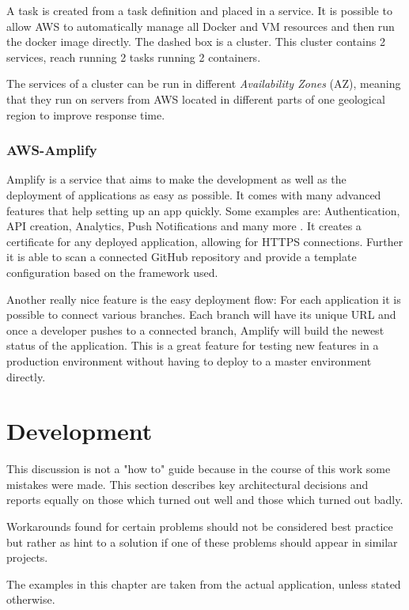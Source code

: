 A task is created from a task definition and placed in a service. It is possible to allow AWS to automatically manage all Docker and VM resources and then run the docker image directly. The dashed box is a cluster. This cluster contains 2 services, reach running 2 tasks running 2 containers. 

The services of a cluster can be run in different \emph{Availability Zones} (AZ), meaning that they run on servers from AWS located in different parts of one geological region to improve response time.

\subsection{AWS-Amplify}
Amplify is a service that aims to make the development as well as the deployment of applications as easy as possible. It comes with many advanced features that help setting up an app quickly. Some examples are: Authentication, API creation, Analytics, Push Notifications and many more \cite{AwsAmplify}. It creates a certificate for any deployed application, allowing for HTTPS connections. Further it is able to scan a connected GitHub repository and provide a template configuration based on the framework used.

Another really nice feature is the easy deployment flow: For each application it is possible to connect various branches. Each branch will have its unique URL and once a developer pushes to a connected branch, Amplify will build the newest status of the application. This is a great feature for testing new features in a production environment without having to deploy to a master environment directly.

\chapter{Development}
This discussion is not a "how to" guide because in the course of this work some mistakes were made. This section describes key architectural decisions and reports equally on those which turned out well and those which turned out badly.

Workarounds found for certain problems should not be considered best practice but rather as hint to a solution if one of these problems should appear in similar projects.

The examples in this chapter are taken from the actual application, unless stated otherwise.

